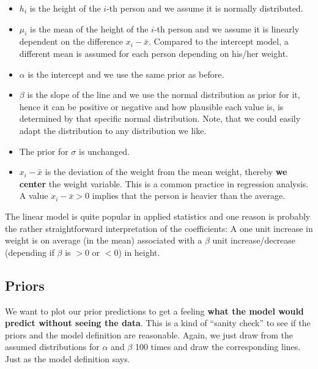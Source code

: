\documentclass[
]{book}
\providecommand{\tightlist}{%
  \setlength{\itemsep}{0pt}\setlength{\parskip}{0pt}}
\begin{document}
\begin{itemize}
\tightlist
\item
  \(h_i\) is the height of the \(i\)-th person and we assume it is normally distributed.
\item
  \(\mu_i\) is the mean of the height of the \(i\)-th person and we
  assume it is linearly dependent on the difference \(x_i-\bar{x}\).
  Compared to the intercept model, a different mean is assumed for each person
  depending on his/her weight.
\item
  \(\alpha\) is the intercept and we use the same prior as before.
\item
  \(\beta\) is the slope of the line and we use the normal distribution as prior for it,
  hence it can be positive or negative and how plausible each value is, is
  determined by that specific normal distribution. Note, that we could
  easily adapt the distribution to any distribution we like.
\item
  The prior for \(\sigma\) is unchanged.
\item
  \(x_i - \bar{x}\) is the deviation of the weight from the mean weight, thereby \textbf{we
  center} the weight variable. This is a common practice in regression analysis.
  A value \(x_i - \bar{x} > 0\) implies that the person is heavier than the average.
\end{itemize}

The linear model is quite popular in applied statistics and one
reason is probably the rather straightforward interpretation of the coefficients:
A one unit increase in weight is on average (in the mean) associated with
a \(\beta\) unit increase/decrease (depending if \(\beta\) is \(>0\) or \(<0\)) in height.

\subsection{Priors}\label{priors}

We want to plot our prior predictions to get a feeling \textbf{what
the model would predict without seeing the data}.
This is a kind of ``sanity check'' to see if the priors and
the model definition are reasonable.
Again, we just draw from the assumed distributions for \(\alpha\) and \(\beta\)
100 times and draw the corresponding lines. Just as the model
definition says.
\end{document}
